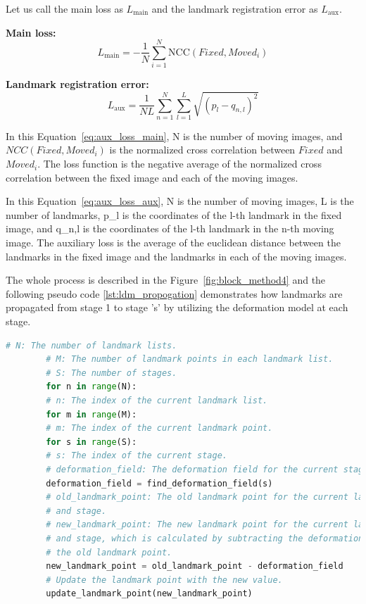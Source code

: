 \documentclass{book}
\begin{document}
	Let us call the main loss as $L_\text{main}$ and the landmark registration error as $L_\text{aux}$.
	
	\textbf{Main loss:}
	\begin{equation}\label{eq:aux_loss_main}
		L_\text{main} = -\frac{1}{N} \sum_{i=1}^N \text{NCC}(Fixed, Moved_i)
	\end{equation}
	
	\textbf{Landmark registration error:}
	\begin{equation}\label{eq:aux_loss_aux}
		L_\text{aux} = \frac{1}{NL} \sum_{n=1}^N \sum_{l=1}^L \sqrt{(p_l - q_{n,l})^2}
	\end{equation}
	
	In this Equation~\ref{eq:aux_loss_main}, N is the number of moving images, and $NCC(Fixed, Moved_i)$ is the normalized cross correlation between $Fixed$ and $Moved_i$. The loss function is the negative average of the normalized cross correlation between the fixed image and each of the moving images.
	
	In this Equation~\ref{eq:aux_loss_aux}, N is the number of moving images, L is the number of landmarks, p\_l is the coordinates of the l-th landmark in the fixed image, and q\_{n,l} is the coordinates of the l-th landmark in the n-th moving image. The auxiliary loss is the average of the euclidean distance between the landmarks in the fixed image and the landmarks in each of the moving images.
	
    The whole process is described in the Figure~\ref{fig:block_method4} and the following pseudo code \ref{lst:ldm_propogation} demonstrates how landmarks are propagated from stage 1 to stage 's' by utilizing the deformation model at each stage.
    
    \begin{lstlisting}[language=Python, label=lst:ldm_propogation, caption=Pseudo code to show how the landmarks are propogated from stage to stage.]
    	# N: The number of landmark lists.
    	# M: The number of landmark points in each landmark list.
    	# S: The number of stages.
    	for n in range(N):
    	# n: The index of the current landmark list.
    	for m in range(M):
    	# m: The index of the current landmark point.
    	for s in range(S):
    	# s: The index of the current stage.
    	# deformation_field: The deformation field for the current stage.
    	deformation_field = find_deformation_field(s)
    	# old_landmark_point: The old landmark point for the current landmark point
    	# and stage.
    	# new_landmark_point: The new landmark point for the current landmark point
    	# and stage, which is calculated by subtracting the deformation field from
    	# the old landmark point.
    	new_landmark_point = old_landmark_point - deformation_field
    	# Update the landmark point with the new value.
    	update_landmark_point(new_landmark_point)
    \end{lstlisting}
\end{document}
